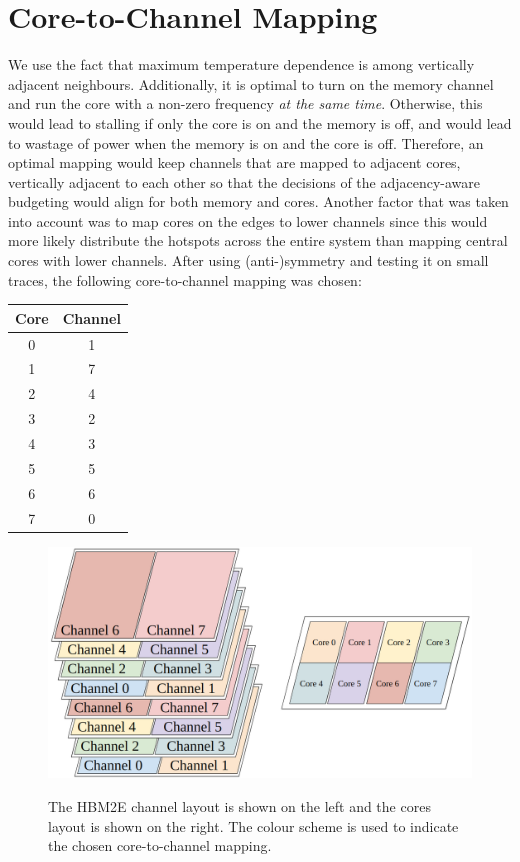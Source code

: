 \documentclass[11pt]{article}
\begin{document}
\section{Core-to-Channel Mapping}
We use the fact that maximum temperature dependence is among vertically adjacent neighbours. Additionally, it is optimal to turn on the memory channel and run the core with a non-zero frequency \textit{at the same time}. Otherwise, this would lead to stalling if only the core is on and the memory is off, and would lead to wastage of power when the memory is on and the core is off. Therefore, an optimal mapping would keep channels that are mapped to adjacent cores, vertically adjacent to each other so that the decisions of the adjacency-aware budgeting would align for both memory and cores. Another factor that was taken into account was to map cores on the edges to lower channels since this would more likely distribute the hotspots across the entire system than mapping central cores with lower channels. After using (anti-)symmetry and testing it on small traces, the following core-to-channel mapping was chosen:
\begin{center}
    \begin{tabular}{|c|c|}
        \hline
        Core & Channel\\
        \hline
        0 & 1\\
        1 & 7\\
        2 & 4\\
        3 & 2\\
        4 & 3\\
        5 & 5\\
        6 & 6\\
        7 & 0\\
        \hline
    \end{tabular}
\end{center}

\begin{figure}[H]
    \centering
    \includegraphics[width=0.75\linewidth]{coretochannel.png}
    \label{fig:ctc}
    \caption{The HBM2E channel layout is shown on the left and the cores layout is shown on the right. The colour scheme is used to indicate the chosen core-to-channel mapping.}
\end{figure}
\end{document}
